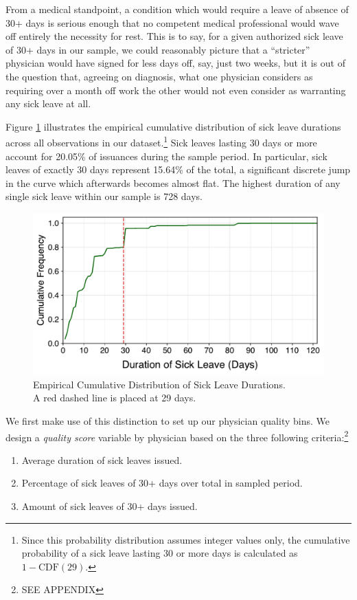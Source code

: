 \documentclass[../main.tex]{subfiles}
\begin{document}
From a medical standpoint, a condition which would require a leave of absence of 30+ days is serious enough that no competent medical professional would wave off entirely the necessity for rest. This is to say, for a given authorized sick leave of 30+ days in our sample, we could reasonably picture that a ``stricter'' physician would have signed for less days off, say, just two weeks, but it is out of the question that, agreeing on diagnosis, what one physician considers as requiring over a month off work the other would not even consider as warranting any sick leave at all.

Figure \ref{fig:cdf} illustrates the empirical cumulative distribution of sick leave durations across all observations in our dataset.\footnote{Since this probability distribution assumes integer values only, the cumulative probability of a sick leave lasting 30 or more days is calculated as $1 - \text{CDF}(29)$.} Sick leaves lasting 30 days or more account for 20.05\% of issuances during the sample period. In particular, sick leaves of exactly 30 days represent 15.64\% of the total, a significant discrete jump in the curve which afterwards becomes almost flat. The highest duration of any single sick leave within our sample is 728 days.

\begin{figure}[H]
    \centering
    \includegraphics[width=0.70\linewidth]{cdf.pdf}
    \captionsetup{justification=centerlast}
    \caption{Empirical Cumulative Distribution of Sick Leave Durations. \\ A red dashed line is placed at 29 days.}
    \label{fig:cdf}
\end{figure}



We first make use of this distinction to set up our physician quality bins. We design a \textit{quality score} variable by physician based on the three following criteria:\footnote{SEE APPENDIX}
\begin{enumerate}[label=\roman*, itemsep=0pt, topsep=0pt]
    \item Average duration of sick leaves issued.
    \item Percentage of sick leaves of 30+ days over total in sampled period.
    \item Amount of sick leaves of 30+ days issued.
\end{enumerate}
\end{document}
